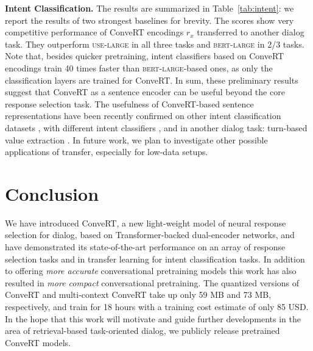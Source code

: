 \documentclass[11pt,a4paper]{article}
\begin{document}
\vspace{1.3mm}
\noindent \textbf{Intent Classification.}
The results are summarized in Table~\ref{tab:intent}: we report the results of two strongest baselines for brevity. The scores show very competitive performance of ConveRT encodings $r_x$ transferred to another dialog task. They outperform \textsc{use-large} in all three tasks and \textsc{bert-large} in 2/3 tasks. Note that, besides quicker pretraining, intent classifiers based on ConveRT encodings train 40 times faster than \textsc{bert-large}-based ones, as only the classification layers are trained for ConveRT. In sum, these preliminary results suggest that ConveRT as a sentence encoder can be useful beyond the core response selection task. The usefulness of ConveRT-based sentence representations have been recently confirmed on other intent classification datasets \cite{Casanueva:2020ws}, with different intent classifiers \cite{Bunk:2020arxiv}, and in another dialog task: turn-based value extraction \cite{Coope:2020acl,Bunk:2020arxiv}. In future work, we plan to investigate other possible applications of transfer, especially for low-data setups.  
\section{Conclusion}
\label{s:conclusion}
We have introduced ConveRT, a new light-weight model of neural response selection for dialog, based on Transformer-backed dual-encoder networks, and have demonstrated its state-of-the-art performance on an array of response selection tasks and in transfer learning for intent classification tasks. In addition to offering \textit{more accurate} conversational pretraining models this work has also resulted in \textit{more compact} conversational pretraining. The quantized versions of ConveRT and multi-context ConveRT take up only 59 MB and 73 MB, respectively, and train for 18 hours with a training cost estimate of only 85 USD. In the hope that this work will motivate and guide further developments in the area of retrieval-based task-oriented dialog, we publicly release pretrained ConveRT models.



%
 

\clearpage


\end{document}

